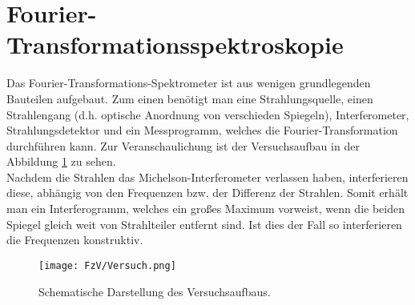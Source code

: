 \section{Fourier-Transformationsspektroskopie}
Das Fourier-Transformations-Spektrometer ist aus wenigen grundlegenden Bauteilen aufgebaut. 
Zum einen benötigt man eine Strahlungsquelle, einen Strahlengang (d.h. optische 
Anordnung von verschieden Spiegeln), Interferometer, Strahlungsdetektor und ein Messprogramm, 
welches die Fourier-Transformation durchführen kann. Zur Veranschaulichung ist der Versuchsaufbau
in der Abbildung \ref{fig:Versuch} zu sehen.\\
Nachdem die Strahlen das Michelson-Interferometer verlassen haben, interferieren diese, abhängig
von den Frequenzen bzw. der Differenz der Strahlen. Somit erhält man ein Interferogramm, 
welches ein großes Maximum vorweist, wenn die beiden Spiegel gleich weit von Strahlteiler 
entfernt sind. Ist dies der Fall so interferieren die Frequenzen konstruktiv.  
\begin{figure}[h]
    \centering
    \texttt{[image: FzV/Versuch.png]}
    \caption{Schematische Darstellung des Versuchsaufbaus.}
    \label{fig:Versuch}
\end{figure}

